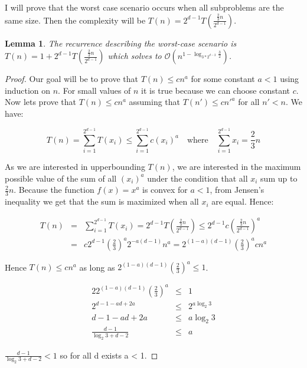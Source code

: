\documentclass[10pt,a4paper]{article}
\newtheorem{lemma}{Lemma}
\newcommand{\Oh}{\mathcal{O}}
\begin{document}
I will prove that the worst case scenario occurs when all subproblems are the same size. Then the complexity will be $T(n)=2^{d-1}T(\frac{\frac{2}{3}n}{2^{d-1}})$.

\begin{lemma}\label{lem:5}
The recurrence describing the worst-case scenario is $T(n)=1+2^{d-1}T(\frac{\frac{2}{3}n}{2^{d-1}})$ which solves to $\Oh(n^{1 - \log_{3*2^{d-2}}{\frac{3}{2}}})$.
\end{lemma}

\begin{proof}

Our goal will be to prove that $T(n) \leq c n^a$ for some constant $a < 1$ using induction on $n$. For small values of $n$ it is true because we can choose constant $c$. Now lets prove that $T(n) \leq c n^a$ assuming that $T(n') \leq c n'^a$ for all $n'<n$. We have:

$$T(n) = \displaystyle\sum\limits_{i=1}^{2^{d-1}} T(x_i)\leq\displaystyle\sum\limits_{i=1}^{2^{d-1}} c(x_i)^{a}  \quad\text{where}\quad  \displaystyle\sum\limits_{i=1}^{2^{d-1}} x_i = \frac{2}{3}n$$ 

As we are interested in upperbounding $T(n)$, we are interested in the maximum possible value of the sum of all $(x_i)^{a}$ under the condition that all $x_{i}$ sum up to $\frac{2}{3}n$. Because the function $f(x)=x^{a}$ is convex for $a<1$, from Jensen's inequality we get that the sum is maximized when all $x_{i}$ are equal. Hence:

\begin{eqnarray*}
T(n) &=& \displaystyle\sum\limits_{i=1}^{2^{d-1}} T(x_i) = 2^{d-1} T\left(\frac{\frac{2}{3}n}{2^{d-1}}\right) \leq 2^{d-1} c \left(\frac{\frac{2}{3}n}{2^{d-1}}\right) ^ a  \\
& = & c 2^{d-1} \left(\frac{2}{3}\right)^a 2^{-a(d-1)} n^a = 2^{(1-a)(d-1)} \left(\frac{2}{3}\right)^a c n^a
\end{eqnarray*}

Hence $T(n)\leq c n^{a}$ as long as $2^{(1-a)(d-1)} (\frac{2}{3})^a \leq 1$.
\bigskip

\begin{alignat*}{2}
2^{(1-a)(d-1)} (\frac{2}{3})^a & \leq & 1 \\
2^{d-1-ad+2a} & \leq & 2^{a \log_2{3}} \\
d-1-ad+2a & \leq & a \log_2{3} \\
\frac{d-1}{\log_2{3} + d - 2}  & \leq & a
\end{alignat*}

$\frac{d-1}{\log_2{3} + d - 2} < 1$ so for all d exists a < 1.

\end{proof}
\end{document}
